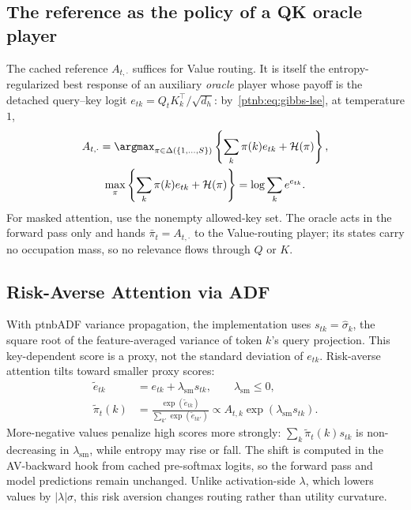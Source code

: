 \subsection{The reference as the policy of a QK oracle player}\label{ptnb:app:attention-oracle}

The cached reference $A_{t,\cdot}$ suffices for Value routing. It is itself the entropy-regularized best response of an auxiliary \emph{oracle} player whose payoff is the detached query--key logit $e_{tk}=Q_tK_k^\top/\sqrt{d_h}$: by~\eqref{ptnb:eq:gibbs-lse}, at temperature $1$,
\begin{equation}\label{ptnb:eq:attn-qk-oracle}
\begin{gathered}
    A_{t,\cdot}=\argmax_{\pi\in\Delta(\{1,\dots,S\})}
      \left\{\sum_k\pi(k)e_{tk}+\mathcal H(\pi)\right\},\\
    \max_{\pi}\left\{\sum_k\pi(k)e_{tk}+\mathcal H(\pi)\right\}
      =\log\sum_k e^{e_{tk}}.
\end{gathered}
\end{equation}
For masked attention, use the nonempty allowed-key set. The oracle acts in the forward pass only and hands $\bar\pi_t=A_{t,\cdot}$ to the Value-routing player; its states carry no occupation mass, so no relevance flows through $Q$ or $K$.

\subsection{Risk-Averse Attention via ADF}\label{ptnb:app:risk-attn}

With \ac{ptnbADF} variance propagation, the implementation uses $s_{tk}=\hat\sigma_k$, the square root of the feature-averaged variance of token $k$'s query projection. This key-dependent score is a proxy, not the standard deviation of $e_{tk}$. Risk-averse attention tilts toward smaller proxy scores:
\begin{align}
    \tilde e_{tk}&=e_{tk}+\lambda_{\mathrm{sm}}s_{tk},
       \qquad\lambda_{\mathrm{sm}}\le0,\label{ptnb:eq:risk-attn-policy}\\
    \tilde\pi_t(k)&=\frac{\exp(\tilde e_{tk})}{\sum_{k'}\exp(\tilde e_{tk'})}
       \propto A_{t,k}\exp(\lambda_{\mathrm{sm}}s_{tk}).\label{ptnb:eq:risk-attn-policy-softmax}
\end{align}
More-negative values penalize high scores more strongly: $\sum_k\tilde\pi_t(k)s_{tk}$ is non-decreasing in $\lambda_{\mathrm{sm}}$, while entropy may rise or fall. The shift is computed in the AV-backward hook from cached pre-softmax logits, so the forward pass and model predictions remain unchanged. Unlike activation-side $\lambda$, which lowers values by $|\lambda|\sigma$, this risk aversion changes routing rather than utility curvature.

